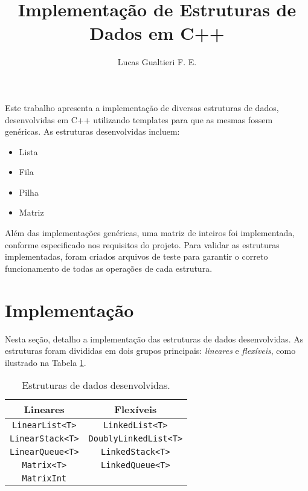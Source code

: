 \documentclass[12pt]{article}
\title{Implementação de Estruturas de Dados em C++}
\author{Lucas Gualtieri F. E.\inst{1} }
\begin{document}
 

\maketitle

\begin{resumo}
Este trabalho apresenta a implementação de diversas estruturas de dados, desenvolvidas em C++ utilizando templates para que as mesmas fossem genéricas. As estruturas desenvolvidas incluem:

\begin{itemize}
\item Lista
\item Fila
\item Pilha
\item Matriz
\end{itemize}

Além das implementações genéricas, uma matriz de inteiros foi implementada, conforme especificado nos requisitos do projeto. Para validar as estruturas implementadas, foram criados arquivos de teste para garantir o correto funcionamento de todas as operações de cada estrutura.
\end{resumo}

\newpage %

\section{Implementação} \label{sec:implementacao}
Nesta seção, detalho a implementação das estruturas de dados desenvolvidas. As estruturas foram divididas em dois grupos principais: \textit{lineares} e \textit{flexíveis}, como ilustrado na Tabela \ref{tab:estruturas}.

\begin{table}[h!]
\centering
\begin{tabular}{|c|c|}
    \hline
    \textbf{Lineares} & \textbf{Flexíveis} \\ \hline
    \texttt{LinearList<T>} &  \texttt{LinkedList<T>} \\ \hline
    \texttt{LinearStack<T>} & \texttt{DoublyLinkedList<T>} \\ \hline
    \texttt{LinearQueue<T>} & \texttt{LinkedStack<T>} \\ \hline
    \texttt{Matrix<T>} &      \texttt{LinkedQueue<T>} \\ \hline
    \texttt{MatrixInt} & \\ \hline
\end{tabular}
\caption{Estruturas de dados desenvolvidas.}
\label{tab:estruturas}
\end{table}
\end{document}
